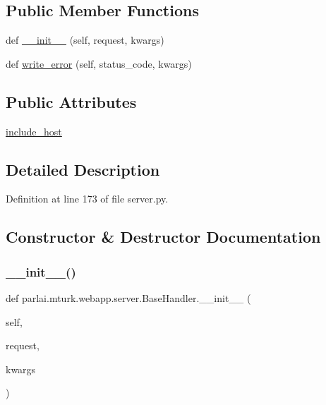 \subsection*{Public Member Functions}
\begin{DoxyCompactItemize}
\item 
def \hyperlink{classparlai_1_1mturk_1_1webapp_1_1server_1_1BaseHandler_aa09a199cc63b8a1294fdbd98688d8b09}{\+\_\+\+\_\+init\+\_\+\+\_\+} (self, request, kwargs)
\item 
def \hyperlink{classparlai_1_1mturk_1_1webapp_1_1server_1_1BaseHandler_a5598d255e3912452fbfcab561819840e}{write\+\_\+error} (self, status\+\_\+code, kwargs)
\end{DoxyCompactItemize}
\subsection*{Public Attributes}
\begin{DoxyCompactItemize}
\item 
\hyperlink{classparlai_1_1mturk_1_1webapp_1_1server_1_1BaseHandler_a757114ed91180c7263e809175993ad07}{include\+\_\+host}
\end{DoxyCompactItemize}


\subsection{Detailed Description}


Definition at line 173 of file server.\+py.



\subsection{Constructor \& Destructor Documentation}
\mbox{\label{classparlai_1_1mturk_1_1webapp_1_1server_1_1BaseHandler_aa09a199cc63b8a1294fdbd98688d8b09}} 
\subsubsection{\texorpdfstring{\+\_\+\+\_\+init\+\_\+\+\_\+()}{\_\_init\_\_()}}
{\footnotesize\ttfamily def parlai.\+mturk.\+webapp.\+server.\+Base\+Handler.\+\_\+\+\_\+init\+\_\+\+\_\+ (\begin{DoxyParamCaption}\item[{}]{self,  }\item[{}]{request,  }\item[{}]{kwargs }\end{DoxyParamCaption})}



